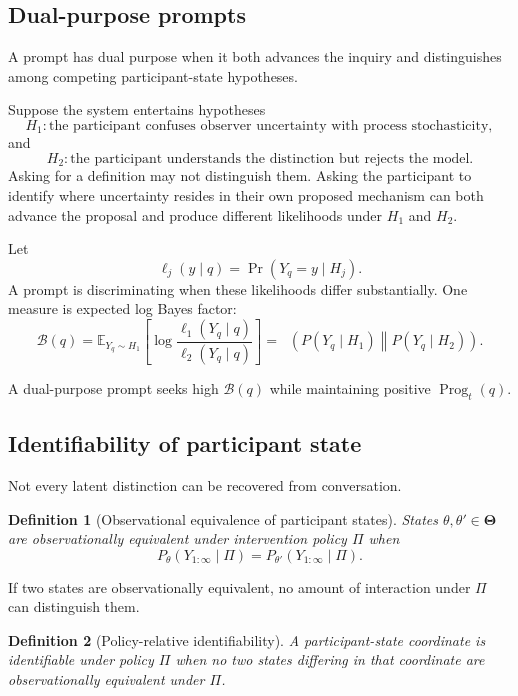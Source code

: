 \documentclass[11pt]{article}
\newtheorem{definition}{Definition}[section]
\theoremstyle{definition}
\DeclareMathOperator{\KL}{D_{\mathrm{KL}}}
\DeclareMathOperator{\Prob}{Pr}
\DeclareMathOperator{\Prog}{Prog}
\newcommand{\E}{\mathbb{E}}
\newcommand{\ThetaSpace}{\boldsymbol{\Theta}}
\begin{document}
\subsection{Dual-purpose prompts}

A prompt has dual purpose when it both advances the inquiry and distinguishes among competing participant-state hypotheses.

Suppose the system entertains hypotheses
\[
H_1:
\text{the participant confuses observer uncertainty with process stochasticity},
\]
and
\[
H_2:
\text{the participant understands the distinction but rejects the model}.
\]
Asking for a definition may not distinguish them. Asking the participant to identify where uncertainty resides in their own proposed mechanism can both advance the proposal and produce different likelihoods under \(H_1\) and \(H_2\).

Let
\[
\ell_j(y\mid q)
=
\Prob(Y_q=y\mid H_j).
\]
A prompt is discriminating when these likelihoods differ substantially. One measure is expected log Bayes factor:
\[
\mathcal B(q)
=
\E_{Y_q\sim H_1}
\left[
\log
\frac{\ell_1(Y_q\mid q)}
{\ell_2(Y_q\mid q)}
\right]
=
\KL
\left(
P(Y_q\mid H_1)
\middle\|
P(Y_q\mid H_2)
\right).
\]

A dual-purpose prompt seeks high \(\mathcal B(q)\) while maintaining positive \(\Prog_t(q)\).

\subsection{Identifiability of participant state}

Not every latent distinction can be recovered from conversation.

\begin{definition}[Observational equivalence of participant states]
States \(\theta,\theta'\in\ThetaSpace\) are observationally equivalent under intervention policy \(\Pi\) when
\[
P_\theta(Y_{1:\infty}\mid\Pi)
=
P_{\theta'}(Y_{1:\infty}\mid\Pi).
\]
\end{definition}

If two states are observationally equivalent, no amount of interaction under \(\Pi\) can distinguish them.

\begin{definition}[Policy-relative identifiability]
A participant-state coordinate is identifiable under policy \(\Pi\) when no two states differing in that coordinate are observationally equivalent under \(\Pi\).
\end{definition}
\end{document}
